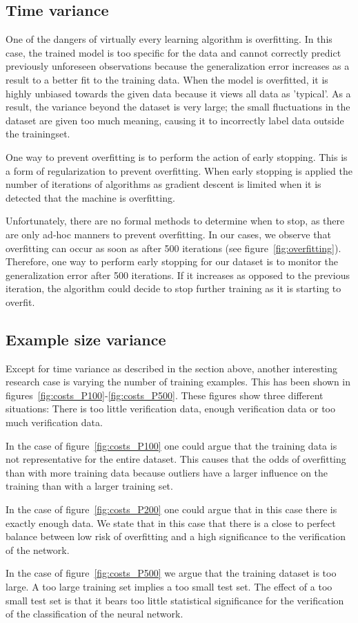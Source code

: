 \subsection{Time variance}
One of the dangers of virtually every learning algorithm is overfitting. 
In this case, the trained model is too specific for the data and cannot correctly predict previously unforeseen observations because the generalization error increases as a result to a better fit to the training data. 
When the model is overfitted, it is highly unbiased towards the given data because it views all data as 'typical'.
As a result, the variance beyond the dataset is very large; the small fluctuations in the dataset are given too much meaning, causing it to incorrectly label data outside the trainingset.

One way to prevent overfitting is to perform the action of early stopping. 
This is a form of regularization to prevent overfitting. 
When early stopping is applied the number of iterations of algorithms as gradient descent is limited when it is detected that the machine is overfitting. 

Unfortunately, there are no formal methods to determine when to stop, as there are only ad-hoc manners to prevent overfitting. 
In our cases, we observe that overfitting can occur as soon as after 500 iterations (see figure~\ref{fig:overfitting}). 
Therefore, one way to perform early stopping for our dataset is to monitor the generalization error after 500 iterations.
If it increases as opposed to the previous iteration, the algorithm could decide to stop further training as it is starting to overfit.

\subsection{Example size variance}
Except for time variance as described in the section above, another interesting research case is varying the number of training examples. 
This has been shown in figures~\ref{fig:costs_P100}-\ref{fig:costs_P500}.
These figures show three different situations: There is too little verification data, enough verification data or too much verification data. 

In the case of figure~\ref{fig:costs_P100} one could argue that the training data is not representative for the entire dataset. 
This causes that the odds of overfitting than with more training data because outliers have a larger influence on the training than with a larger training set.

In the case of figure~\ref{fig:costs_P200} one could argue that in this case there is exactly enough data.
We state that in this case that there is a close to perfect balance between low risk of overfitting and a high significance to the verification of the network.

In the case of figure~\ref{fig:costs_P500} we argue that the training dataset is too large. 
A too large training set implies a too small test set. The effect of a too small test set is that it bears too little statistical significance for the verification of the classification of the neural network.

